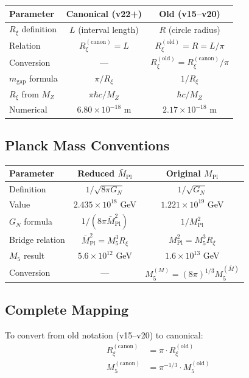 \documentclass[11pt,a4paper]{article}
\newcommand{\Rxi}{R_\xi}
\newcommand{\Mpl}{M_{\mathrm{Pl}}}
\newcommand{\Mplbar}{\bar{M}_{\mathrm{Pl}}}
\newcommand{\Mfive}{M_5}
\newcommand{\GN}{G_N}
\newcommand{\MZ}{M_Z}
\newcommand{\mgap}{m_{\mathrm{gap}}}
\begin{document}
\begin{center}
\begin{tabular}{lcc}
\toprule
\textbf{Parameter} & \textbf{Canonical (v22+)} & \textbf{Old (v15--v20)} \\
\midrule
$\Rxi$ definition & $L$ (interval length) & $R$ (circle radius) \\
Relation & $\Rxi^{\mathrm{(canon)}} = L$ & $\Rxi^{\mathrm{(old)}} = R = L/\pi$ \\
Conversion & --- & $\Rxi^{\mathrm{(old)}} = \Rxi^{\mathrm{(canon)}}/\pi$ \\
$\mgap$ formula & $\pi/\Rxi$ & $1/\Rxi$ \\
$\Rxi$ from $\MZ$ & $\pi\hbar c/\MZ$ & $\hbar c/\MZ$ \\
Numerical & $6.80 \times 10^{-18}$ m & $2.17 \times 10^{-18}$ m \\
\bottomrule
\end{tabular}
\end{center}

\subsection{Planck Mass Conventions}

\begin{center}
\begin{tabular}{lcc}
\toprule
\textbf{Parameter} & \textbf{Reduced $\Mplbar$} & \textbf{Original $\Mpl$} \\
\midrule
Definition & $1/\sqrt{8\pi\GN}$ & $1/\sqrt{\GN}$ \\
Value & $2.435 \times 10^{18}$ GeV & $1.221 \times 10^{19}$ GeV \\
$\GN$ formula & $1/(8\pi\Mplbar^2)$ & $1/\Mpl^2$ \\
Bridge relation & $\Mplbar^2 = \Mfive^3 \Rxi$ & $\Mpl^2 = \Mfive^3 \Rxi$ \\
$\Mfive$ result & $5.6 \times 10^{12}$ GeV & $1.6 \times 10^{13}$ GeV \\
Conversion & --- & $\Mfive^{(M)} = (8\pi)^{1/3}\Mfive^{(\bar{M})}$ \\
\bottomrule
\end{tabular}
\end{center}

\subsection{Complete Mapping}

To convert from old notation (v15--v20) to canonical:
\begin{align}
\Rxi^{\mathrm{(canon)}} &= \pi \cdot \Rxi^{\mathrm{(old)}} \label{eq:Rxi-map}\\
\Mfive^{\mathrm{(canon)}} &= \pi^{-1/3} \cdot \Mfive^{\mathrm{(old)}} \label{eq:M5-map}
\end{align}
\end{document}
